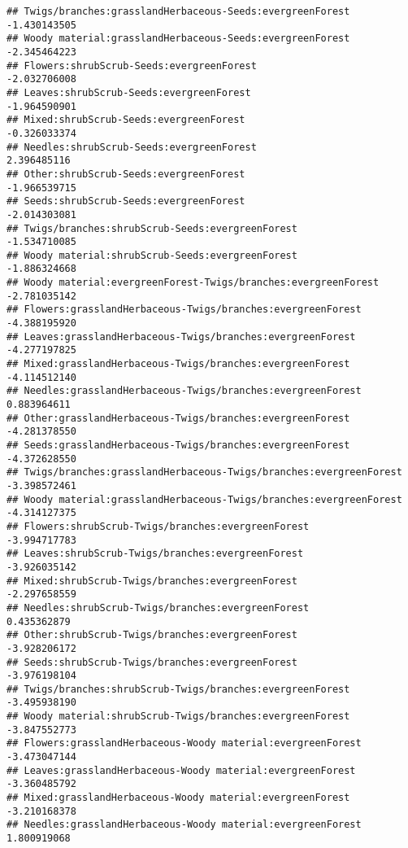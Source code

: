 \documentclass[
]{article}
\begin{document}
\begin{verbatim}
## Twigs/branches:grasslandHerbaceous-Seeds:evergreenForest              -1.430143505
## Woody material:grasslandHerbaceous-Seeds:evergreenForest              -2.345464223
## Flowers:shrubScrub-Seeds:evergreenForest                              -2.032706008
## Leaves:shrubScrub-Seeds:evergreenForest                               -1.964590901
## Mixed:shrubScrub-Seeds:evergreenForest                                -0.326033374
## Needles:shrubScrub-Seeds:evergreenForest                               2.396485116
## Other:shrubScrub-Seeds:evergreenForest                                -1.966539715
## Seeds:shrubScrub-Seeds:evergreenForest                                -2.014303081
## Twigs/branches:shrubScrub-Seeds:evergreenForest                       -1.534710085
## Woody material:shrubScrub-Seeds:evergreenForest                       -1.886324668
## Woody material:evergreenForest-Twigs/branches:evergreenForest         -2.781035142
## Flowers:grasslandHerbaceous-Twigs/branches:evergreenForest            -4.388195920
## Leaves:grasslandHerbaceous-Twigs/branches:evergreenForest             -4.277197825
## Mixed:grasslandHerbaceous-Twigs/branches:evergreenForest              -4.114512140
## Needles:grasslandHerbaceous-Twigs/branches:evergreenForest             0.883964611
## Other:grasslandHerbaceous-Twigs/branches:evergreenForest              -4.281378550
## Seeds:grasslandHerbaceous-Twigs/branches:evergreenForest              -4.372628550
## Twigs/branches:grasslandHerbaceous-Twigs/branches:evergreenForest     -3.398572461
## Woody material:grasslandHerbaceous-Twigs/branches:evergreenForest     -4.314127375
## Flowers:shrubScrub-Twigs/branches:evergreenForest                     -3.994717783
## Leaves:shrubScrub-Twigs/branches:evergreenForest                      -3.926035142
## Mixed:shrubScrub-Twigs/branches:evergreenForest                       -2.297658559
## Needles:shrubScrub-Twigs/branches:evergreenForest                      0.435362879
## Other:shrubScrub-Twigs/branches:evergreenForest                       -3.928206172
## Seeds:shrubScrub-Twigs/branches:evergreenForest                       -3.976198104
## Twigs/branches:shrubScrub-Twigs/branches:evergreenForest              -3.495938190
## Woody material:shrubScrub-Twigs/branches:evergreenForest              -3.847552773
## Flowers:grasslandHerbaceous-Woody material:evergreenForest            -3.473047144
## Leaves:grasslandHerbaceous-Woody material:evergreenForest             -3.360485792
## Mixed:grasslandHerbaceous-Woody material:evergreenForest              -3.210168378
## Needles:grasslandHerbaceous-Woody material:evergreenForest             1.800919068

\end{verbatim}
\end{document}

